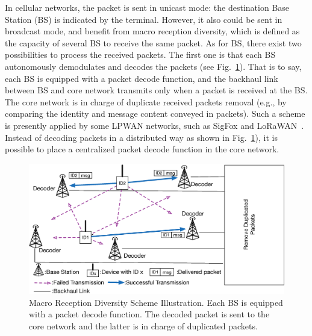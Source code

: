 In cellular networks, the packet is sent in unicast mode: the destination Base Station (BS) is indicated by the terminal. However, it also could be sent in broadcast mode, and benefit from macro reception diversity, which is defined as the capacity of several BS to receive the same packet. As for BS, there exist two possibilities to process the received packets. The first one is that each BS autonomously demodulates and decodes the packets (see Fig.~\ref{fig:macro_diversity_recpetion_illustration}). That is to say, each BS is equipped with a packet decode function, and the backhaul link between BS and core network transmits only when a packet is received at the BS. The core network is in charge of duplicate received packets removal (e.g., by comparing the identity and message content conveyed in packets). Such a scheme is presently applied by some LPWAN networks, such as SigFox and LoRaWAN~\cite{ietf-lpwan-overview-03}. Instead of decoding packets in a distributed way as shown in Fig.~\ref{fig:macro_diversity_recpetion_illustration}), it is possible to place a centralized packet decode function in the core network. 
\begin{figure}[!ht]
	\centering
	\includegraphics[width=\linewidth]{Chapter5/Figures/Macro_Diversity_Recpetion_Illustration}
	\caption{Macro Reception Diversity Scheme Illustration. Each BS is equipped with a packet decode function. The decoded packet is sent to the core network and the latter is in charge of duplicated packets.
}
	\label{fig:macro_diversity_recpetion_illustration}
\end{figure} 

